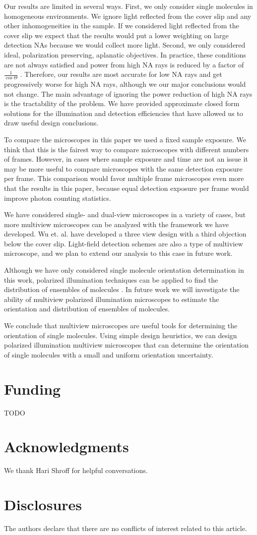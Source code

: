\documentclass[10pt]{article}
\begin{document}
Our results are limited in several ways. First, we only consider single
molecules in homogeneous environments. We ignore light reflected from the cover
slip and any other inhomogeneities in the sample. If we considered light
reflected from the cover slip we expect that the results would put a lower
weighting on large detection NAs because we would collect more light. Second, we
only considered ideal, polarization preserving, aplanatic objectives. In
practice, these conditions are not always satisfied and power from high NA rays
is reduced by a factor of $\frac{1}{\cos\Theta}$ \cite{nov2006}. Therefore, our
results are most accurate for low NA rays and get progressively worse for high
NA rays, although we our major conclusions would not change. The main advantage
of ignoring the power reduction of high NA rays is the tractability of the
problem. We have provided approximate closed form solutions for the illumination
and detection efficiencies that have allowed us to draw useful design
conclusions.

To compare the microscopes in this paper we used a fixed sample exposure. We
think that this is the fairest way to compare microscopes with different numbers
of frames. However, in cases where sample exposure and time are not an issue it
may be more useful to compare microscopes with the same detection exposure per
frame. This comparison would favor multiple frame microscopes even more that the
results in this paper, because equal detection exposure per frame would improve
photon counting statistics.

We have considered single- and dual-view microscopes in a variety of cases, but
more multiview microscopes can be analyzed with the framework we have
developed. Wu et. al. have developed a three view design with a third objection
below the cover slip\cite{wu2016}. Light-field detection schemes are also a type
of multiview microscope\cite{levoy2006}, and we plan to extend our analysis to
this case in future work.

Although we have only considered single molecule orientation determination in
this work, polarized illumination techniques can be applied to find the
distribution of ensembles of molecules \cite{mehta2016, backer2016}. In future
work we will investigate the ability of multiview polarized illumination
microscopes to estimate the orientation and distribution of ensembles of
molecules.

We conclude that multiview microscopes are useful tools for determining the
orientation of single molecules. Using simple design heuristics, we can design
polarized illumination multiview microscopes that can determine the orientation
of single molecules with a small and uniform orientation uncertainty.

\section*{Funding}
TODO

\section*{Acknowledgments}
We thank Hari Shroff for helpful conversations. 

\section*{Disclosures}
The authors declare that there are no conflicts of interest related to this article.
\end{document}
